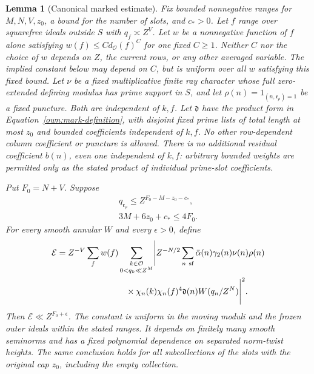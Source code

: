 \documentclass[12pt]{article}
\newtheorem{lemma}[theorem]{Lemma}
\begin{document}
\begin{lemma}[Canonical marked estimate]\label{lem:canonical-moment}
Fix bounded nonnegative ranges for \(M,N,V,z_0\), a bound for the number
of slots, and \(c_*>0\).  Let \(f\) range over squarefree ideals outside
\(S\) with \(q_f\asymp Z^V\).  Let \(w\) be a nonnegative function of
\(f\) alone satisfying \(w(f)\le C d_{\mathcal O}(f)^C\) for one fixed
\(C\ge1\).  Neither \(C\) nor the choice of \(w\) depends on \(Z\),
the current rows, or any other averaged variable.  The implied constant
below may depend on \(C\), but is uniform over all \(w\) satisfying this
fixed bound.  Let \(\nu\) be a fixed
multiplicative finite ray character whose full zero-extended defining
modulus has prime support in \(S\), and let
\(\rho(n)=1_{(n,\mathfrak r_\rho)=1}\) be a fixed puncture.  Both are
independent of \(k,f\).  Let \(\mathfrak d\) have the product form in
Equation~\eqref{own:mark-definition}, with disjoint fixed prime lists of total
length at most \(z_0\) and bounded coefficients independent of \(k,f\).
No other row-dependent column coefficient or puncture is allowed.
There is no additional residual coefficient \(b(n)\), even one
independent of \(k,f\): arbitrary bounded weights are permitted only
as the stated product of individual prime-slot coefficients.

Put \(F_0=N+V\).  Suppose
\begin{equation}\label{eq:invariant}
 \begin{gathered}
 q_{\mathfrak r_\rho}\le Z^{F_0-M-z_0-c_*},\\
 3M+6z_0+c_*\le4F_0.
 \end{gathered}
\end{equation}
For every smooth annular \(W\) and every \(\epsilon>0\), define
\begin{equation}\label{eq:canonical-energy}
 \begin{split}
 \mathcal E={}&Z^{-V}\sum_f w(f)
 \sum_{\substack{k\in\mathcal O\\0<q_k\ll Z^M}}
 \Biggl|Z^{-N/2}\sum_{n\ {\rm sf}}
 \bar\alpha(n)\gamma_2(n)\nu(n)\rho(n)\\
 &\hspace{24mm}\times
 \chi_n(k)\chi_n(f)^4\mathfrak d(n)W(q_n/Z^N)\Biggr|^2.
 \end{split}
\end{equation}
Then \(\mathcal E\ll Z^{F_0+\epsilon}\).  The constant is uniform in
the moving moduli and the frozen outer ideals within the stated ranges.
It depends on finitely many smooth seminorms and has a fixed polynomial
dependence on separated norm-twist heights.  The same conclusion holds
for all subcollections of the slots with the original cap \(z_0\),
including the empty collection.
\end{lemma}
\end{document}
